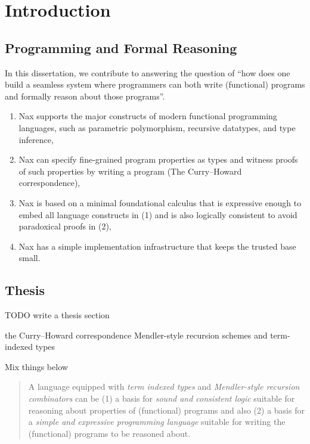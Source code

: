 \chapter{Introduction}\label{ch:intro}

\section{Programming and Formal Reasoning}\label{sec:intro:motiv}

In this dissertation, we contribute to answering the question of
``how does one build a seamless system where programmers can both
write (functional) programs and formally reason about those programs''.



\begin{enumerate}[(1)]
 \item Nax supports the major constructs of modern
	 functional programming languages, such as
	 parametric polymorphism, recursive datatypes, and type inference,
 \item Nax can specify fine-grained program properties as types and
	 witness proofs of such properties by writing a program
	 (The Curry--Howard correspondence),
 \item Nax is based on a minimal foundational calculus
 that is expressive enough to embed all language constructs in (1)
 and is also logically consistent to avoid paradoxical proofs in (2),
 \item Nax has a simple implementation infrastructure
	 that keeps the trusted base small.
\end{enumerate}


\section{Thesis}\label{sec:intro:thesis}
TODO write a thesis section

the Curry--Howard correspondence
Mendler-style recursion schemes and term-indexed types

Mix things below

\begin{quote}
A language equipped with \emph{term indexed types} and
\emph{Mendler-style recursion combinators} can be 
(1) a basis for \emph{sound and consistent logic}
suitable for reasoning about properties of (functional) programs
and also
(2) a basis for a \emph{simple and expressive programming language}
suitable for writing the (functional) programs to be reasoned about.
\end{quote}



